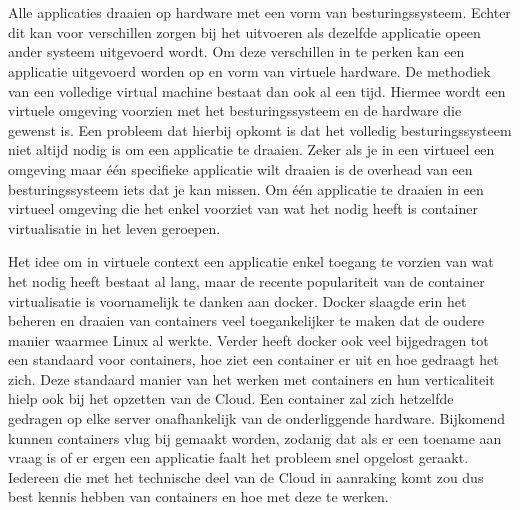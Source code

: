 
\chapter{}
\label{ch:inleiding}


Alle applicaties draaien op hardware met een vorm van besturingssysteem. Echter dit kan voor verschillen zorgen bij het uitvoeren als dezelfde applicatie opeen ander systeem uitgevoerd wordt. Om deze verschillen in te perken kan een applicatie uitgevoerd worden op en vorm van virtuele hardware. De methodiek van een volledige virtual machine bestaat dan ook al een tijd. Hiermee wordt een virtuele omgeving voorzien met het besturingssysteem en de hardware die gewenst is. Een probleem dat hierbij opkomt is dat het volledig besturingssysteem niet altijd nodig is om een applicatie te draaien.  Zeker als je in een virtueel een omgeving maar één specifieke applicatie wilt draaien is de overhead van een besturingssysteem iets dat je kan missen.  Om één applicatie te draaien in een virtueel omgeving die het enkel voorziet van wat het nodig heeft is container virtualisatie in het leven geroepen.
 
Het idee om in virtuele context een applicatie enkel toegang te vorzien van wat het nodig heeft bestaat al lang, maar de recente populariteit van de container virtualisatie is voornamelijk te danken aan docker.  Docker slaagde erin het beheren en draaien van containers veel toegankelijker te maken dat de oudere manier waarmee Linux al werkte.  Verder heeft docker ook veel bijgedragen tot een standaard voor containers, hoe ziet een container er uit en hoe gedraagt het zich.  Deze standaard manier van het werken met containers en hun verticaliteit hielp ook bij het opzetten van de Cloud. Een container zal zich hetzelfde gedragen op elke server onafhankelijk van de onderliggende hardware. Bijkomend kunnen containers vlug bij gemaakt worden, zodanig dat als er een toename aan vraag is of er ergen een applicatie faalt het probleem snel opgelost geraakt. Iedereen die met het technische deel van de Cloud in aanraking komt zou dus best kennis hebben van containers en hoe met deze te werken.


\section{}
\label{sec:probleemstelling}

